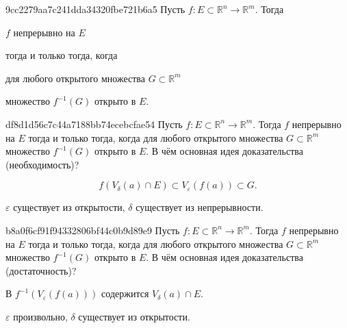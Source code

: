 \begin{note}{9cc2279aa7c241dda34320fbe721b6a5}
    Пусть \({ f : E \subset \mathbb R^{n} \to \mathbb R^{m} }\). Тогда  \begin{icloze}{3}\({ f }\) непрерывно на \({ E }\)\end{icloze}
    \begin{icloze}{4}тогда и только тогда, когда\end{icloze}
    \begin{icloze}{2}для любого открытого множества \({ G \subset \mathbb R^{m} }\)\end{icloze} \begin{icloze}{1}множество \({ f^{-1}(G) }\) открыто в \({ E }\).\end{icloze}
\end{note}

\begin{note}{df8d1d56c7c44a7188bb74ecebcfae54}
    Пусть \({ f : E \subset \mathbb R^{n} \to \mathbb R^{m} }\). Тогда  \({ f }\) непрерывно на \({ E }\)
    тогда и только тогда, когда
    для любого открытого множества \({ G \subset \mathbb R^{m} }\) множество \({ f^{-1}(G) }\) открыто в \({ E }\).
    В чём основная идея доказательства (необходимость)?

    \begin{cloze}{1}


        \[
            f(V_\delta(a) \cap E) \subset V_\varepsilon(f(a)) \subset G.
        \]
        \begin{center}
            \tiny
            \({ \varepsilon }\) существует из открытости,
            \({ \delta }\) существует из непрерывности.
        \end{center}
    \end{cloze}
\end{note}

\begin{note}{b8a0f6cf91f94332806bf44c0b9d89e9}
    Пусть \({ f : E \subset \mathbb R^{n} \to \mathbb R^{m} }\). Тогда  \({ f }\) непрерывно на \({ E }\)
    тогда и только тогда, когда
    для любого открытого множества \({ G \subset \mathbb R^{m} }\) множество \({ f^{-1}(G) }\) открыто в \({ E }\).
    В чём основная идея доказательства (достаточность)?

    \begin{cloze}{1}
        В \({ f^{-1}(V_\varepsilon(f(a))) }\) содержится \({ V_\delta(a) \cap E }\).
        \begin{center}
            \tiny
            \({ \varepsilon }\) произвольно, \({ \delta }\) существует из открытости.
        \end{center}
    \end{cloze}
\end{note}


